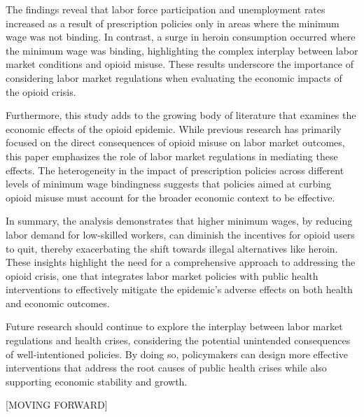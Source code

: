 \documentclass[12pt,a4paper]{article}
\begin{document}
The findings reveal that labor force participation and unemployment rates increased as a result of prescription policies only in areas where the minimum wage was not binding. In contrast, a surge in heroin consumption occurred where the minimum wage was binding, highlighting the complex interplay between labor market conditions and opioid misuse. These results underscore the importance of considering labor market regulations when evaluating the economic impacts of the opioid crisis.

Furthermore, this study adds to the growing body of literature that examines the economic effects of the opioid epidemic. While previous research has primarily focused on the direct consequences of opioid misuse on labor market outcomes, this paper emphasizes the role of labor market regulations in mediating these effects. The heterogeneity in the impact of prescription policies across different levels of minimum wage bindingness suggests that policies aimed at curbing opioid misuse must account for the broader economic context to be effective.

In summary, the analysis demonstrates that higher minimum wages, by reducing labor demand for low-skilled workers, can diminish the incentives for opioid users to quit, thereby exacerbating the shift towards illegal alternatives like heroin. These insights highlight the need for a comprehensive approach to addressing the opioid crisis, one that integrates labor market policies with public health interventions to effectively mitigate the epidemic's adverse effects on both health and economic outcomes.

Future research should continue to explore the interplay between labor market regulations and health crises, considering the potential unintended consequences of well-intentioned policies. By doing so, policymakers can design more effective interventions that address the root causes of public health crises while also supporting economic stability and growth.

[MOVING FORWARD]

\newpage

\printbibliography

\newpage
\end{document}
